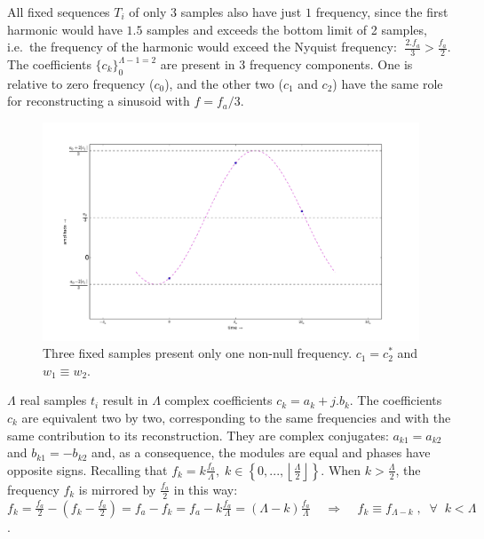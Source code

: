 All fixed sequences $T_i$ of only $3$ samples also have just $1$ frequency, since the first harmonic would have $1.5$ samples and exceeds the bottom limit of 2 samples, i.e.\ the frequency of the harmonic would exceed the Nyquist frequency:  $\; \frac{2. f_a}{3} > \frac{f_a}{2} $. 
The coefficients $\{c_k\}_0^{\Lambda-1=2}$ are present in 3 frequency components. One is relative to zero frequency ($c_0$), and the other two ($c_1$ and $c_2$) have the same role for reconstructing a sinusoid with $f=f_a/3$.

 \begin{figure}
     \centering
         \includegraphics[width=.7\textwidth]{figures/amostras3b}
     \caption{Three fixed samples present only one non-null frequency. $c_1=c_2^*$ and $w_1 \equiv w_2$.}
         \label{fig:amostras3}
 \end{figure}

$\Lambda$ real samples $t_i$ result in $\Lambda$ complex coefficients $c_k=a_k+j.b_k$. The coefficients $c_k$ are equivalent two by two, corresponding to the same frequencies and with the same contribution to its reconstruction. They are complex conjugates: $a_{k1}=a_{k2}$ and $b_{k1}=-b_{k2}$ and, as a consequence, the modules are equal and phases have opposite signs. Recalling that $f_k = k\frac{f_a}{\Lambda}, \; k \in \left\{0, ..., \left \lfloor \frac{\Lambda}{2} \right \rfloor \right\} $. When $k > \frac{\Lambda}{2}$, the frequency $f_k$ is mirrored by $\frac{f_a}{2}$ in this way: $f_k=\frac{f_a}{2} - (f_k-\frac{f_a}{2})=f_a-f_k=f_a - k\frac{f_a}{\Lambda}=(\Lambda-k)\frac{f_a}{\Lambda} \;\;\;\; \Rightarrow \;\;\;\; f_k\equiv f_{\Lambda-k} \; ,\;\; \forall \;\; k<\Lambda$. 

